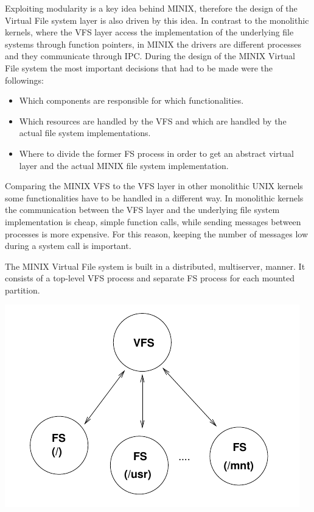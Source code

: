 Exploiting modularity is a key idea behind MINIX, therefore the design of the Virtual File system layer is also driven by this idea. In contrast to the monolithic kernels, where the VFS layer access the implementation of the underlying file systems through function pointers, in MINIX the drivers are different processes and they communicate through IPC. During the design of the MINIX Virtual File system the most important decisions that had to be made were the followings:
\begin{itemize}
\item Which components are responsible for which functionalities.

\item Which resources are handled by the VFS and which are handled by the actual file system implementations.

\item  Where to divide the former FS process in order to get an abstract virtual layer and the actual MINIX file system implementation.
\end{itemize}

Comparing the MINIX VFS to the VFS layer in other monolithic UNIX kernels some functionalities have to be handled in a different way. In monolithic kernels the communication between the VFS layer and the underlying file system implementation is cheap, simple function calls, while sending messages between processes is more expensive. For this reason, keeping the number of messages low during a system call is important.

The MINIX Virtual File system is built in a distributed, multiserver, manner. It consists of a top-level VFS process and separate FS process for each mounted partition.

\includegraphics[scale=0.7]{./pics/vfsfs.png}

